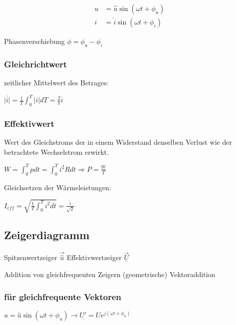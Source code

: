 \documentclass[10pt,a4paper]{scrartcl}
\begin{document}
\begin{multicols*}{3}
	\begin{align*}
	u&=\hat{u}\sin(\omega t+\phi_u)\\
	i&=\hat{i}\sin(\omega t+\phi_i)
	\end{align*}
	
	Phasenverschiebung $\phi = \phi_u-\phi_i$
	
	 
	
	\subsubsection{Gleichrichtwert}
	
	zeitlicher Mittelwert des Betrages: 
	
	$\bar{|i|}=\frac{1}{T}\int_0^T{|i|dT}=\frac{2}{\pi}\hat{i}$
	
	 
	
	\subsubsection{Effektivwert}
	
	Wert des Gleichstroms der in einem Widerstand denselben Verlust wie der betrachtete Wechselstrom erwirkt.
	
	$W=\int_0^T{pdt}=\int_0^T{i^2Rdt}\Rightarrow P=\frac{W}{T}$
	
	Gleichsetzen der Wärmeleistungen:
	
	$I_{eff}=\sqrt{\frac{1}{T}\int_0^T{i^2dt}}=\frac{\hat{i}}{\sqrt{2}}$
	 
	\columnbreak
	 	 
	\subsection{Zeigerdiagramm}

	
	Spitzenwertzeiger $\vec{\hat{u}}$ \hfill Effektivwertzeiger $\vec{\underline{U}}$
	
	Addition von gleichfrequenten Zeigern \dahe (geometrische) Vektoraddition
	
	 	
	
	\subsubsection{für gleichfrequente Vektoren}
	
	$u=\hat{u}\sin(\omega t + \phi_u)\rightarrow\underline{U'}=Ue^{j(\omega t +\phi_u)}$
	
	

\end{multicols*}
\end{document}
